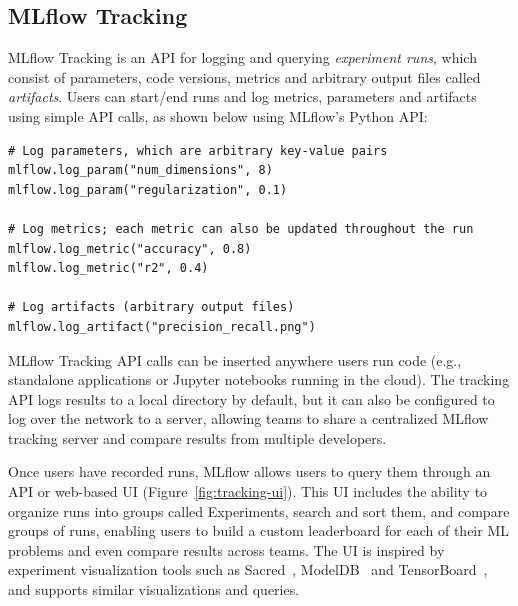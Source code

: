 \documentclass[11pt]{article}
\begin{document}

\subsection{MLflow Tracking}

MLflow Tracking is an API for logging and querying \emph{experiment runs}, which consist of parameters, code versions, metrics and arbitrary output files called \emph{artifacts}. Users can start/end runs and log metrics, parameters and artifacts using simple API calls, as shown below using MLflow's Python API:

\begin{Verbatim}[frame=single,fontsize=\small,samepage=true]
# Log parameters, which are arbitrary key-value pairs
mlflow.log_param("num_dimensions", 8)
mlflow.log_param("regularization", 0.1)

# Log metrics; each metric can also be updated throughout the run
mlflow.log_metric("accuracy", 0.8)
mlflow.log_metric("r2", 0.4)

# Log artifacts (arbitrary output files)
mlflow.log_artifact("precision_recall.png")
\end{Verbatim}

MLflow Tracking API calls can be inserted anywhere users run code (e.g., standalone applications or Jupyter notebooks running in the cloud). The tracking API logs results to a local directory by default, but it can also be configured to log over the network to a server, allowing teams to share a centralized MLflow tracking server and compare results from multiple developers.

Once users have recorded runs, MLflow allows users to query them through an API or web-based UI (Figure~\ref{fig:tracking-ui}). This UI includes the ability to organize runs into groups called Experiments, search and sort them, and compare groups of runs, enabling users to build a custom leaderboard for each of their ML problems and even compare results across teams. The UI is inspired by experiment visualization tools such as Sacred~\cite{sacred}, ModelDB~\cite{modeldb} and TensorBoard~\cite{tensorboard}, and supports similar visualizations and queries.
\end{document}
